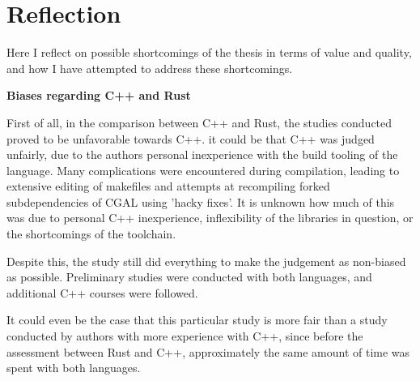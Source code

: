 





\section{Reflection}
\label{sec:reflection}

Here I reflect on possible shortcomings of the thesis in terms of value and quality, and how I have attempted to address these shortcomings. 

\textbf{Biases regarding C++ and Rust}

First of all, in the comparison between C++ and Rust, the studies conducted proved to be unfavorable towards C++. 
it could be that C++ was judged unfairly, due to the authors personal inexperience with the build tooling of the language. 
Many complications were encountered during compilation, leading to extensive editing of makefiles and attempts at recompiling forked subdependencies of CGAL using 'hacky fixes'.  
It is unknown how much of this was due to personal C++ inexperience, inflexibility of the libraries in question, or the shortcomings of the toolchain. 

Despite this, the study still did everything to make the judgement as non-biased as possible.
Preliminary studies were conducted with both languages, and additional C++ courses were followed. 

It could even be the case that this particular study is more fair than a study conducted by authors with more experience with C++, 
since before the assessment between Rust and C++, approximately the same amount of time was spent with both languages. 

